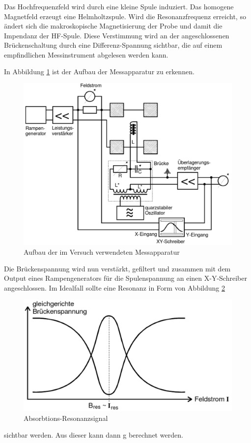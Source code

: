 Das Hochfrequenzfeld wird durch eine kleine Spule induziert. Das homogene Magnetfeld erzeugt eine Helmholtzspule. Wird die Resonanzfrequenz erreicht, so ändert sich die makroskopische Magnetisierung der Probe und damit die Impendanz der HF-Spule. Diese Verstimmung wird an der angeschlossenen Brückenschaltung durch eine Differenz-Spannung sichtbar, die auf einem empfindlichen Messinstrument abgelesen werden kann.

In Abbildung \ref{pic_aufbau} ist der Aufbau der Messapparatur zu erkennen.
\begin{figure}[H]
\includegraphics[scale=0.4]{../pics/aufbau.pdf}
\caption{Aufbau der im Versuch verwendeten Messapparatur\protect\footnotemark[2]}
\label{pic_aufbau}
\end{figure}

Die Brückenspannung wird nun verstärkt, gefiltert und zusammen mit dem Output eines Rampengenerators für die Spulenspannung an einen X-Y-Schreiber angeschlossen. Im Idealfall sollte eine Resonanz in Form von Abbildung \ref{pic_resonanz} 
\begin{figure}[H]
\includegraphics[scale=0.5]{../pics/resonanz.pdf}
\caption{Absorbtions-Resonanzsignal\protect\footnotemark[3]}
\label{pic_resonanz}
\end{figure}
sichtbar werden. Aus dieser kann dann g berechnet werden.





